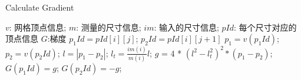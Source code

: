 \documentclass[11pt]{article}
\begin{document}
\begin{CJK*}{UTF8}{gkai}
\begin{algorithm}[h]
\caption{Calculate Gradient}
    \begin{algorithmic}[1]
        \Require
            $v$: 网格顶点信息;
            $m$: 测量的尺寸信息;
            $im$: 输入的尺寸信息;
            $pId$: 每个尺寸对应的顶点信息
        \Ensure
            $G$:梯度
            \State $p_1Id = pId[i][j]$; $p_2Id = pId[i][j+1]$
            \State $p_1 = v(p_1Id)$; $p_2 = v(p_2Id)$;
            \State $l = |p_1 - p_2|$;
            \State $l_t = \frac{im(i)}{m(i)}l$;
            \State $g$ = 4 * $(l^2 - l_t^2)^2 * (p_1- p_2)$;
            \State $G(p_1Id) = g$;  $G(p_2Id) = -g$;
        \EndFor
      \EndFor
    \end{algorithmic}
\end{algorithm}
\end{CJK*}
\end{document}
